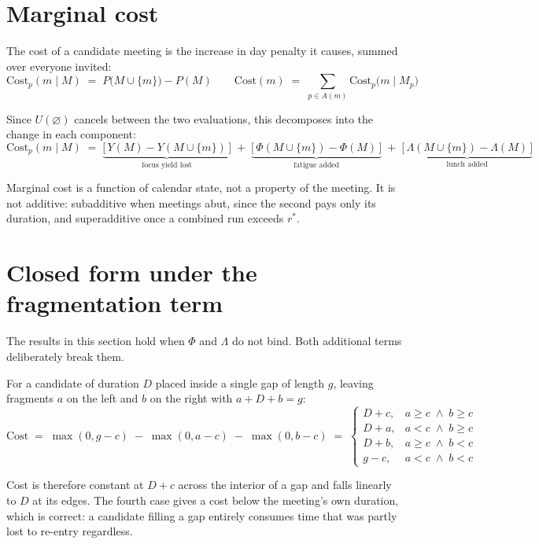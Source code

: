 \documentclass[11pt]{article}
\begin{document}
\section{Marginal cost}

The cost of a candidate meeting is the increase in day penalty it causes,
summed over everyone invited:
\[
\mathrm{Cost}_p(m \mid M) \;=\; P\bigl(M \cup \{m\}\bigr) - P(M)
\qquad
\mathrm{Cost}(m) \;=\; \sum_{p \in A(m)} \mathrm{Cost}_p\bigl(m \mid M_p\bigr)
\]

Since $U(\varnothing)$ cancels between the two evaluations, this decomposes
into the change in each component:
\[
\mathrm{Cost}_p(m \mid M) \;=\;
\underbrace{\bigl[\, Y(M) - Y(M \cup \{m\}) \,\bigr]}_{\text{focus yield lost}}
\;+\; \underbrace{\bigl[\, \Phi(M \cup \{m\}) - \Phi(M) \,\bigr]}_{\text{fatigue added}}
\;+\; \underbrace{\bigl[\, \Lambda(M \cup \{m\}) - \Lambda(M) \,\bigr]}_{\text{lunch added}}
\]

Marginal cost is a function of calendar state, not a property of the
meeting. It is not additive: subadditive when meetings abut, since the
second pays only its duration, and superadditive once a combined run exceeds
$r^{*}$.

\section{Closed form under the fragmentation term}

The results in this section hold when $\Phi$ and $\Lambda$ do not bind. Both
additional terms deliberately break them.

For a candidate of duration $D$ placed inside a single gap of length $g$,
leaving fragments $a$ on the left and $b$ on the right with $a + D + b = g$:
\[
\mathrm{Cost} \;=\; \max(0, g-c) \;-\; \max(0, a-c) \;-\; \max(0, b-c)
\;=\;
\begin{cases}
D + c, & a \ge c \;\wedge\; b \ge c \\[2pt]
D + a, & a < c \;\wedge\; b \ge c \\[2pt]
D + b, & a \ge c \;\wedge\; b < c \\[2pt]
g - c, & a < c \;\wedge\; b < c
\end{cases}
\]

Cost is therefore constant at $D + c$ across the interior of a gap and falls
linearly to $D$ at its edges. The fourth case gives a cost below the
meeting's own duration, which is correct: a candidate filling a gap entirely
consumes time that was partly lost to re-entry regardless.
\end{document}
